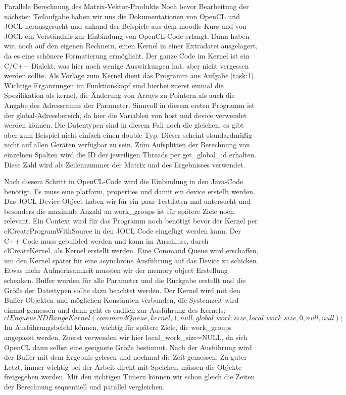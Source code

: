 \documentclass[
ngerman,
subtask=ruled %
]{tudaexercise}
\begin{document}
	
	\begin{task}{Parallele Berechnung des Matrix-Vektor-Produkts}
		Noch bevor Bearbeitung der nächsten Teilaufgabe haben wir uns die Dokumentationen von OpenCL und JOCL herausgesucht und anhand der Beispiele aus dem moodle-Kurs und von JOCL ein Verständnis zur Einbindung von OpenCL-Code erlangt.
		Dann haben wir, noch auf den eigenen Rechnern, einen Kernel in einer Extradatei ausgelagert, da es eine schönere Formatierung ermöglicht.
		Der ganze Code im Kernel ist ein C/C++ Dialekt, was hier noch wenige Auswirkungen hat, aber nicht vergessen werden sollte.
		Als Vorlage zum Kernel dient das Programm aus Aufgabe \ref{task:1}. Wichtige Ergänzungen im Funktionskopf sind hierbei zuerst einmal die Spezifikation als kernel, die Änderung von Arrays zu Pointern als auch die Angabe des Adressraums der Parameter.
		Sinnvoll in diesem ersten Programm ist der global-Adressbereich, da hier die Variablen von host und device verwendet werden können.
		Die Datentypen sind in diesem Fall noch die gleichen, es gibt aber zum Beispiel nicht einfach einen double Typ. Dieser scheint standardmäßig nicht auf allen Geräten verfügbar zu sein.
		Zum Aufsplitten der Berechnung von einzelnen Spalten wird die ID der jeweiligen Threads per get\_global\_id erhalten.
		Diese Zahl wird als Zeilennummer der Matrix und des Ergebnisses verwendet.
		
		Nach diesem Schritt in OpenCL-Code wird die Einbindung in den Java-Code benötigt.
		Es muss eine platform, properties und damit ein device erstellt werden. Das JOCL Device-Object haben wir für ein paar Testdaten mal untersucht und besonders die maximale Anzahl an work\_groups ist für spätere Ziele noch relevant.
		Ein Context wird für das Programm noch benötigt bevor der Kernel per clCreateProgramWithSource in den JOCL Code eingefügt werden kann.
		Der C++ Code muss gebuilded werden und kann im Anschluss, durch clCreateKernel, als Kernel erstellt werden.
		Eine Command Queue wird erschaffen, um den Kernel später für eine asynchrone Ausführung auf das Device zu schicken.
		Etwas mehr Aufmerksamkeit mussten wir der memory object Erstellung schenken. Buffer wurden für alle Parameter und die Rückgabe erstellt und die Größe der Dateitypen sollte dazu beachtet werden.
		Der Kernel wird mit den Buffer-Objekten und möglichen Konstanten verbunden, die Systemzeit wird einmal gemessen und dann geht es endlich zur Ausführung des Kernels:
		$clEnqueueNDRangeKernel(commandQueue, kernel, 1, null,
		global\_work\_size, local\_work\_size,
		0, null, null);$
		Im Ausführungsbefehl können, wichtig für spätere Ziele, die work\_groups angepasst werden. Zuerst verwenden wir hier local\_work\_size=NULL, da sich OpenCL dann selbst eine geeignete Größe bestimmt.
		Nach der Ausführung wird der Buffer mit dem Ergebnis gelesen und nochmal die Zeit gemessen.
		Zu guter Letzt, immer wichtig bei der Arbeit direkt mit Speicher, müssen die Objekte freigegeben werden.
		Mit den richtigen Timern können wir schon gleich die Zeiten der Berechnung sequentiell und parallel vergleichen.
		

\end{task}
\end{document}
